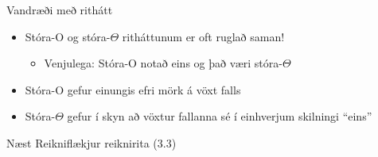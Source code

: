 \documentclass[handout]{beamer}
\begin{document}
\begin{frame}{Vandræði með rithátt}
\begin{itemize}
 \item Stóra-O og stóra-$\Theta$ ritháttunum er oft ruglað saman!
 \begin{itemize}
  \item Venjulega: Stóra-O notað eins og það væri stóra-$\Theta$
 \end{itemize}
 \item Stóra-O gefur einungis efri mörk á vöxt falls
 \item Stóra-$\Theta$ gefur í skyn að vöxtur fallanna sé í einhverjum skilningi ``eins''
\end{itemize}
\end{frame}

\begin{frame}{Næst}
Reikniflækjur reiknirita (3.3)
\end{frame}
\end{document}
